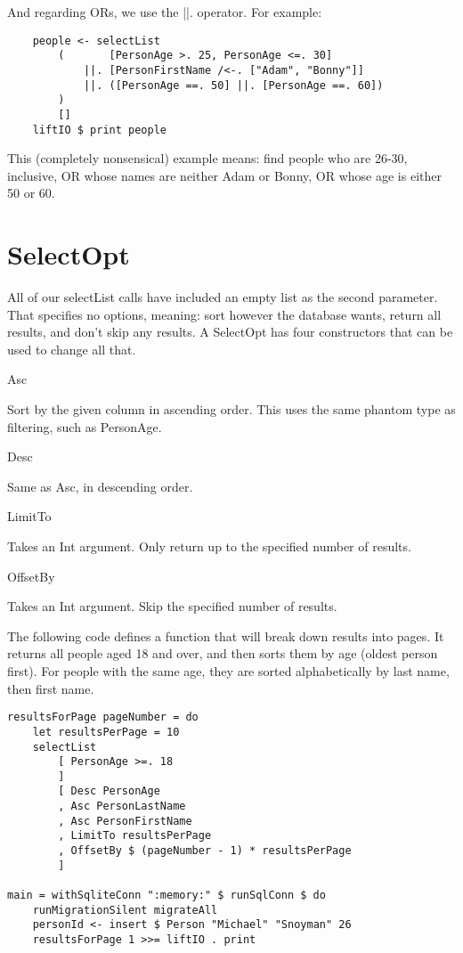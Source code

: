And regarding ORs, we use the ||. operator. For example:

\begin{lstlisting}
    people <- selectList
        (       [PersonAge >. 25, PersonAge <=. 30]
            ||. [PersonFirstName /<-. ["Adam", "Bonny"]]
            ||. ([PersonAge ==. 50] ||. [PersonAge ==. 60])
        )
        []
    liftIO $ print people
\end{lstlisting}%

This (completely nonsensical) example means: find people who are 26-30, inclusive, OR whose names are neither Adam or Bonny, OR whose age is either 50 or 60.

\section{SelectOpt}

All of our selectList calls have included an empty list as the second parameter. That specifies no options, meaning: sort however the database wants, return all results, and don't skip any results. A SelectOpt has four constructors that can be used to change all that.

Asc

Sort by the given column in ascending order. This uses the same phantom type as filtering, such as PersonAge.

Desc

Same as Asc, in descending order.

LimitTo

Takes an Int argument. Only return up to the specified number of results.

OffsetBy

Takes an Int argument. Skip the specified number of results.

The following code defines a function that will break down results into pages. It returns all people aged 18 and over, and then sorts them by age (oldest person first). For people with the same age, they are sorted alphabetically by last name, then first name.

\begin{lstlisting}
resultsForPage pageNumber = do
    let resultsPerPage = 10
    selectList
        [ PersonAge >=. 18
        ]
        [ Desc PersonAge
        , Asc PersonLastName
        , Asc PersonFirstName
        , LimitTo resultsPerPage
        , OffsetBy $ (pageNumber - 1) * resultsPerPage
        ]

main = withSqliteConn ":memory:" $ runSqlConn $ do
    runMigrationSilent migrateAll
    personId <- insert $ Person "Michael" "Snoyman" 26
    resultsForPage 1 >>= liftIO . print
\end{lstlisting}%

